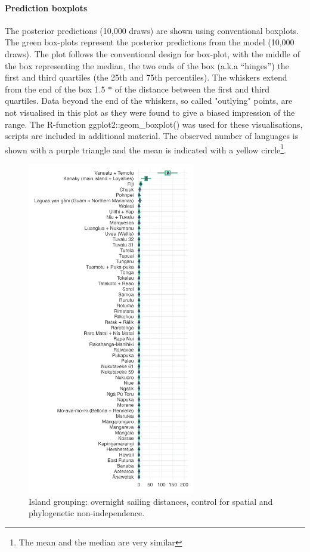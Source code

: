 \documentclass[unnumsec,webpdf,modern,medium]{oup-authoring-template}
\begin{document}
\FloatBarrier
\paragraph{Prediction boxplots}
\label{appendix_supp_figs_pred_boxplots}

The posterior predictions (10,000 draws) are shown using conventional boxplots. The green box-plots represent the posterior predictions from the model (10,000 draws). The plot follows the conventional design for box-plot, with the middle of the box representing the median, the two ends of the box (a.k.a ``hinges'') the first and third quartiles (the 25th and 75th percentiles). The whiskers extend from the end of the box 1.5 $\ast$  of the distance between the first and third quartiles. Data beyond the end of the whiskers, so called "outlying" points, are not visualised in this plot as they were found to give a biased impression of the range. The R-function  ggplot2::geom\_boxplot() was used for these visualisations, scripts are included in additional material. The observed number of languages is shown with a purple triangle and the mean is indicated with a yellow circle\footnote{The mean and the median are very similar}.

\begin{figure}[ht]
\includegraphics[width=0.65\textwidth]{brms_predict_SBZR_control_spatialphylo.png}
\caption{Island grouping: overnight sailing distances, control for spatial and phylogenetic non-independence.}
\label{brms_predict_SBZR_control_spatialphylo}
\end{figure}
\end{document}
